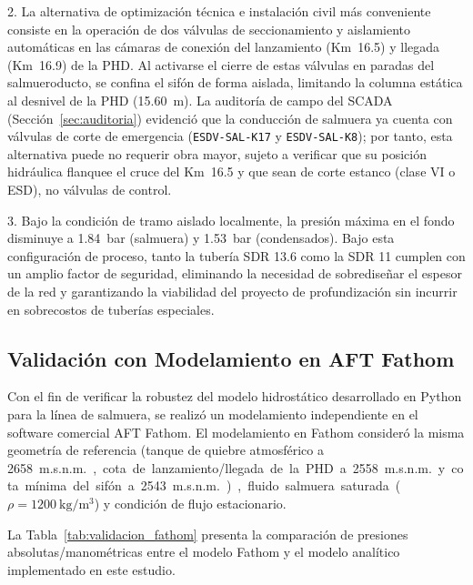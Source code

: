 2. La alternativa de optimización técnica e instalación civil más conveniente consiste en la operación de dos válvulas de seccionamiento y aislamiento automáticas en las cámaras de conexión del lanzamiento (Km~16.5) y llegada (Km~16.9) de la PHD. Al activarse el cierre de estas válvulas en paradas del salmueroducto, se confina el sifón de forma aislada, limitando la columna estática al desnivel de la PHD (\SI{15.60}{\meter}). La auditoría de campo del SCADA (Sección~\ref{sec:auditoria}) evidenció que la conducción de salmuera ya cuenta con válvulas de corte de emergencia (\texttt{ESDV-SAL-K17} y \texttt{ESDV-SAL-K8}); por tanto, esta alternativa puede no requerir obra mayor, sujeto a verificar que su posición hidráulica flanquee el cruce del Km~16.5 y que sean de corte estanco (clase VI o ESD), no válvulas de control.

3. Bajo la condición de tramo aislado localmente, la presión máxima en el fondo disminuye a \SI{1.84}{bar} (salmuera) y \SI{1.53}{bar} (condensados). Bajo esta configuración de proceso, tanto la tubería SDR 13.6 como la SDR 11 cumplen con un amplio factor de seguridad, eliminando la necesidad de sobrediseñar el espesor de la red y garantizando la viabilidad del proyecto de profundización sin incurrir en sobrecostos de tuberías especiales.

\subsection{Validación con Modelamiento en AFT Fathom}
\label{ssec:validacion_fathom}

Con el fin de verificar la robustez del modelo hidrostático desarrollado en Python para la línea de salmuera, se realizó un modelamiento independiente en el software comercial AFT Fathom. El modelamiento en Fathom consideró la misma geometría de referencia (tanque de quiebre atmosférico a \SI{2658}{m.s.n.m.}, cota de lanzamiento/llegada de la PHD a \SI{2558}{m.s.n.m.} y cota mínima del sifón a \SI{2543}{m.s.n.m.}), fluido salmuera saturada ($\rho = \SI{1200}{\kilogram\per\cubic\meter}$) y condición de flujo estacionario.

La Tabla~\ref{tab:validacion_fathom} presenta la comparación de presiones absolutas/manométricas entre el modelo Fathom y el modelo analítico implementado en este estudio.

